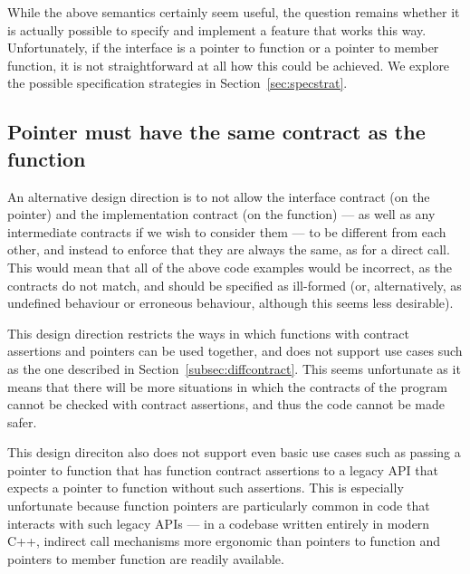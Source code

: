 While the above semantics certainly seem useful, the question remains whether it is actually possible to specify and implement a feature that works this way. Unfortunately, if the interface is a pointer to function or a pointer to member function, it is not straightforward at all how this could be achieved. We explore the possible specification strategies in Section~\ref{sec:specstrat}.

\subsection{Pointer must have the same contract as the function}
\label{subsec:samecontract}

An alternative design direction is to not allow the interface contract (on the pointer) and the implementation contract (on the function) --- as well as any intermediate contracts if we wish to consider them --- to be different from each other, and instead to enforce that they are always the same, as for a direct call. This would mean that all of the above code examples would be incorrect, as the contracts do not match, and should be specified as ill-formed (or, alternatively, as undefined behaviour or erroneous behaviour, although this seems less desirable).

This design direction restricts the ways in which functions with contract assertions and pointers can be used together, and does not support use cases such as the one described in Section~\ref{subsec:diffcontract}. This seems unfortunate as it means that there will be more situations in which the contracts of the program cannot be checked with contract assertions, and thus the code cannot be made safer. 

This design direciton also does not support even basic use cases such as passing a pointer to function that has function contract assertions to a legacy API that expects a pointer to function without such assertions. This is especially unfortunate because function pointers are particularly common in code that interacts with such legacy APIs --- in a codebase written entirely in modern C++, indirect call mechanisms more ergonomic than pointers to function and pointers to member function are readily available.

